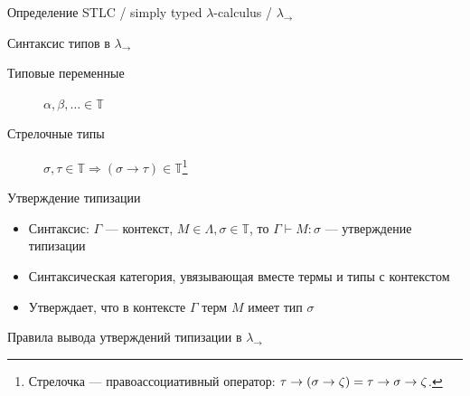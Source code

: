     \begin{frame}{Определение STLC / simply typed $\lambda$-calculus / $\lambda_\to$}
        \vspace{-0.5em}
        \pause
        \begin{block}{Синтаксис типов в $\lambda_{\rightarrow}$}
            \begin{description}
                \item[Типовые переменные] \vspace{-1em} $\alpha, \beta, \ldots \in \mathbb{T}$
                \hspace{2em}
                \item[Стрелочные типы] \vspace{-2em} $\sigma, \tau \in \mathbb{T} \Rightarrow (\sigma\rightarrow\tau)\in\mathbb{T}$\footnote{Стрелочка --- правоассоциативный оператор: $\tau \to (\sigma \to \zeta) = \tau \to \sigma \to \zeta$.}
                \hspace{2em}
            \end{description}
        \end{block}
        \pause
        \begin{block}{Утверждение типизации}
            \begin{itemize}
                \item Синтаксис: $\Gamma$ --- контекст, $M \in \Lambda, \sigma \in \mathbb{T}$, то $\Gamma \vdash M : \sigma$ --- утверждение типизации
                \item Синтаксическая категория, увязывающая вместе термы и типы с контекстом
                \item Утверждает, что в контексте $\Gamma$ терм $M$ имеет тип $\sigma$
            \end{itemize}
        \end{block}
        \pause
        \begin{block}{Правила вывода утверждений типизации в $\lambda_{\rightarrow}$}

\end{block}
\end{frame}
